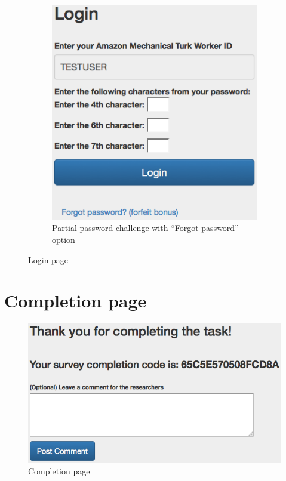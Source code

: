 \begin{figure}[H]
{\begin{subfigure}[t]{0.4\textwidth}
        \end{subfigure}
        ~
        \begin{subfigure}[t]{0.4\textwidth}
            \includegraphics[width=\textwidth]{Images/2-login-ppass-forgot}
            \caption{Partial password challenge with ``Forgot password'' option}
            \label{fig:login-forgot}
        \end{subfigure}
      }
      \caption{Login page}\label{fig:login}
    \end{figure}

  \section{Completion page}
    \label{aps:complete}
    \begin{figure}[H]
      \centering
      \includegraphics[width=\textwidth]{Images/3-success}
      \caption{Completion page}
      \label{fig:complete}
    \end{figure}